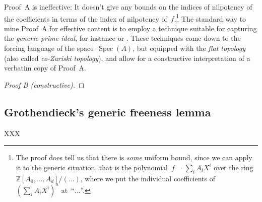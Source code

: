 \documentclass{amsart}
\theoremstyle{definition}
\theoremstyle{plain}
\theoremstyle{remark}
\newcommand{\ZZ}{\mathbb{Z}}
\DeclareMathOperator{\Spec}{Spec}
\newcommand{\?}{\,{:}\,}
\begin{document}
Proof~A is ineffective: It doesn't give any bounds on the indices of nilpotency
of the coefficients in terms of the index of nilpotency of~$f$.\footnote{The
proof does tell us that there is \emph{some} uniform bound, since we can apply
it to the generic situation, that is the polynomial~$f = \sum_i A_i X^i$ over the
ring~$\ZZ[A_0,\ldots,A_d]/(\ldots)$, where we put the individual coefficients of~$(\sum_i
A_i X^i)^n$ at~``$\ldots$''.} The standard way to mine Proof~A for effective
content is to employ a technique suitable for capturing the \emph{generic prime
ideal}, for instance \cite{XXXcoquand} or \cite{XXXschuster}. These techniques
come down to the forcing language of the space~$\Spec(A)$, but equipped with
the \emph{flat topology} (also called \emph{co-Zariski topology}), and allow
for a constructive interpretation of a verbatim copy of Proof~A.

\begin{proof}[Proof B (constructive)]
\end{proof}

\subsection{Grothendieck's generic freeness lemma}

XXX
\end{document}
